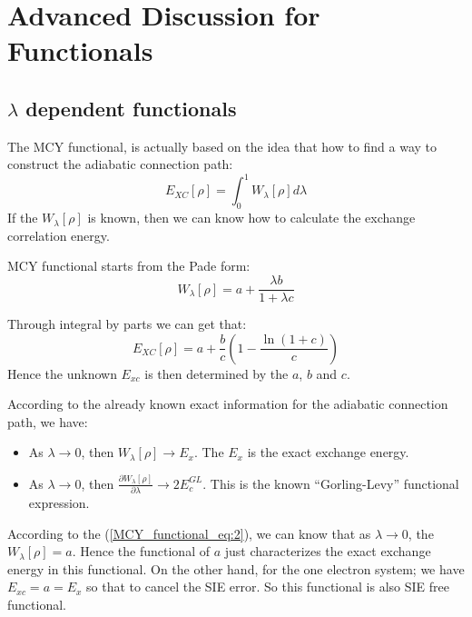 %
%
%
%
\chapter{Advanced Discussion for Functionals}
%
%
%


\section{$\lambda$ dependent functionals}
%
%

The MCY functional, is actually based on the idea that how to find a way to
construct the adiabatic connection path:
\begin{equation}
 E_{XC}[\rho] = \int_{0}^{1} W_{\lambda}[\rho] d \lambda
\label{MCY_functional_eq:1}
\end{equation}
If the $W_{\lambda}[\rho]$ is known, then we can know how to calculate the
exchange correlation energy.

MCY functional starts from the Pade form:
\begin{equation}
 W_{\lambda}[\rho] = a + \frac{\lambda b}{1 + \lambda c}
\label{MCY_functional_eq:2}
\end{equation}

Through integral by parts we can get that:
\begin{equation}
 E_{XC}[\rho] = a + \frac{b}{c}\left(1 - \frac{\ln
(1+c)}{c}\right)
\label{MCY_functional_eq:3}
\end{equation}
Hence the unknown $E_{xc}$ is then determined by the $a$, $b$ and $c$.

According to the already known exact information for the adiabatic connection
path, we have:
\begin{itemize}
 \item As $\lambda \rightarrow 0$, then $W_{\lambda}[\rho]\rightarrow E_{x}$.
The $E_{x}$ is the exact exchange energy.
\item  As $\lambda \rightarrow 0$, then
$\frac{\partial W_{\lambda}[\rho]}{\partial \lambda}\rightarrow
2 E_{c}^{GL}$. This is the known ``Gorling-Levy'' functional expression.
\end{itemize}

According to the (\ref{MCY_functional_eq:2}), we can know that as $\lambda
\rightarrow 0$, the $W_{\lambda}[\rho] = a$. Hence the functional of $a$ just
characterizes the exact exchange energy in this functional. On the other hand,
for the one electron system; we have $E_{xc} = a = E_{x}$ so that to cancel the
SIE error. So this functional is also SIE free functional.
 
